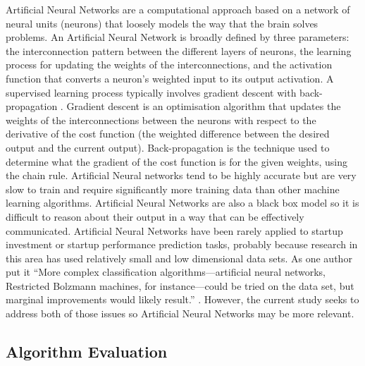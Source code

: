 \documentclass[../thesis/thesis.tex]{subfiles}
\begin{document}
Artificial Neural Networks are a computational approach based on a network of neural units (neurons) that loosely models the way that the brain solves problems. An Artificial Neural Network is broadly defined by three parameters: the interconnection pattern between the different layers of neurons, the learning process for updating the weights of the interconnections, and the activation function that converts a neuron's weighted input to its output activation. A supervised learning process typically involves gradient descent with back-propagation \cite{CITE}. Gradient descent is an optimisation algorithm that updates the weights of the interconnections between the neurons with respect to the derivative of the cost function (the weighted difference between the desired output and the current output). Back-propagation is the technique used to determine what the gradient of the cost function is for the given weights, using the chain rule. Artificial Neural networks tend to be highly accurate but are very slow to train and require significantly more training data than other machine learning algorithms. Artificial Neural Networks are also a black box model so it is difficult to reason about their output in a way that can be effectively communicated. Artificial Neural Networks have been rarely applied to startup investment or startup performance prediction tasks, probably because research in this area has used relatively small and low dimensional data sets. As one author put it ``More complex classification algorithms—artificial neural networks, Restricted Bolzmann machines, for instance—could be tried on the data set, but marginal improvements would likely result.'' \cite{beckwith2016}. However, the current study seeks to address both of those issues so Artificial Neural Networks may be more relevant.

\subsection{Algorithm Evaluation}
\end{document}
